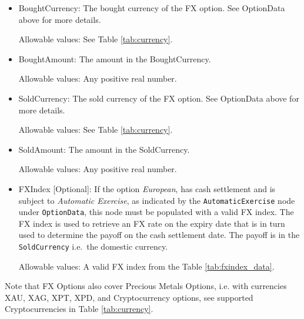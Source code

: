 \begin{itemize}
\item BoughtCurrency: The bought currency of the FX option. See OptionData above for more details.

Allowable values: See Table \ref{tab:currency}.

\item BoughtAmount: The amount in the BoughtCurrency.

Allowable values: Any positive real number.

\item SoldCurrency: The sold currency of the FX option. See OptionData above for more details.

Allowable values: See Table \ref{tab:currency}.

\item SoldAmount: The amount in the SoldCurrency.

Allowable values: Any positive real number.

\item FXIndex [Optional]: If the option \textit{European}, has cash settlement and is subject to \textit{Automatic Exercise}, as indicated by the \lstinline!AutomaticExercise! node under \lstinline!OptionData!, this node must be populated with a valid FX index. The FX index is used to retrieve an FX rate on the expiry date that is in turn used to determine the payoff on the cash settlement date. The payoff is in the \lstinline!SoldCurrency! i.e.\ the domestic currency.

Allowable values: A valid FX index from the Table \ref{tab:fxindex_data}.

\end{itemize}

Note that FX Options also cover Precious Metals Options, i.e. with currencies XAU, XAG, XPT, XPD, and Cryptocurrency options,  see supported Cryptocurrencies in Table \ref{tab:currency}.